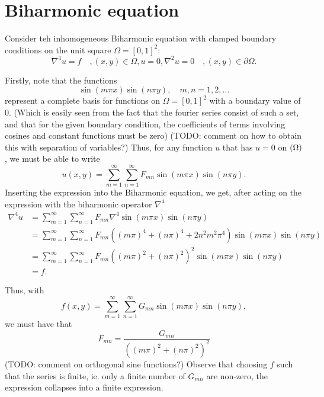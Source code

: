 \section{Biharmonic equation}
\label{sec:PDE}

\newtheorem{theorem}{Theorem}
\newtheorem{lemma}{Lemma}

Consider teh inhomogeneous Biharmonic equation with clamped boundary conditions on the unit square $\Omega = [0, 1]^2$:
\begin{subequations}\label{eq:PDE}
  \begin{equation}
    \nabla^4 u = f \quad, (x, y) \in \Omega,
  \end{equation}
  \begin{equation}
    u = 0, \nabla^2u = 0 \quad, (x, y) \in \partial\Omega.
  \end{equation}
\end{subequations}

Firstly, note that the functions
$$
\sin(m \pi x) \sin(n \pi y), \quad m,n = 1, 2, \dots
$$
represent a complete basis for functions on $\Omega = [0, 1]^2$ with a boundary value of 0.
(Which is easily seen from the fact that the fourier series consist of such a set, and that for the given boundary condition, the coefficients of terms involving cosines and constant functions must be zero)
(TODO: comment on how to obtain this with separation of variables?)
Thus, for any function $u$ that has $u = 0$ on $\del\Omega$, we must be able to write
$$
u(x, y) =
\sum_{m=1}^\infty
\sum_{n=1}^\infty
F_{mn}
\sin(m\pi x)
\sin(n\pi y).
$$
Inserting the expression into the Biharmonic equation, we get, after acting on the expression with the biharmonic operator $\nabla^4$
\begin{align}
  \nabla^4 u &=
  \sum_{m=1}^\infty
  \sum_{n=1}^\infty
  F_{mn}
  \nabla^4
  \sin(m\pi x)\sin(n\pi y)\\
  &=
  \sum_{m=1}^\infty
  \sum_{n=1}^\infty
  F_{mn}
  \left(
  (m\pi)^4 + (n\pi)^4 + 2n^2m^2\pi^4
  \right)
  \sin(m\pi x)\sin(n\pi y)\\
  &=
  \sum_{m=1}^\infty
  \sum_{n=1}^\infty
  F_{mn}
  \left(
  (m\pi)^2 + (n\pi)^2
  \right)^2
  \sin(m\pi x)\sin(n\pi y)\\
  &= f.
\end{align}

Thus, with
$$
f(x, y)
=
\sum_{m=1}^\infty
\sum_{n=1}^\infty
G_{mn}
\sin(m\pi x)\sin(n\pi y),
$$
we must have that
$$
F_{mn} =
\frac{
  G_{mn}
}{
  \left(
  (m\pi)^2 + (n\pi)^2
  \right)^2
}
$$
(TODO: comment on orthogonal sine functions?)
Observe that choosing $f$ such that the series is finite, ie. only a finite number of $G_{mn}$ are non-zero, the expression collapses into a finite expression.

